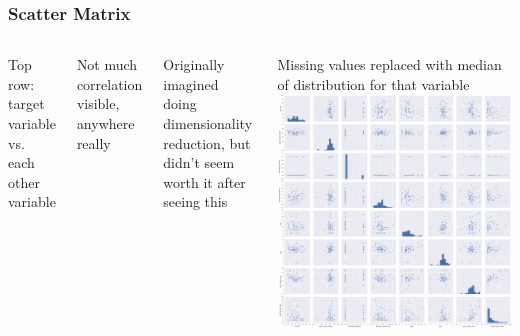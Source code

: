 \documentclass[10pt,professionalfonts,xcolor=table]{beamer}
\begin{document}
\begin{frame}
\frametitle{Scatter Matrix}
\begin{columns}[c]
\bangon
\item Top row: target variable vs. each other variable
\gap
\item Not much correlation visible, anywhere really
\gap
\item Originally imagined doing dimensionality reduction, but didn't seem worth it after seeing this
\gap
\item Missing values replaced with median of distribution for that variable
\bangoff
{}
   \includegraphics[height=0.75\textheight]{figures/scatter_matrix.png}
\end{columns}
\end{frame}
\end{document}

